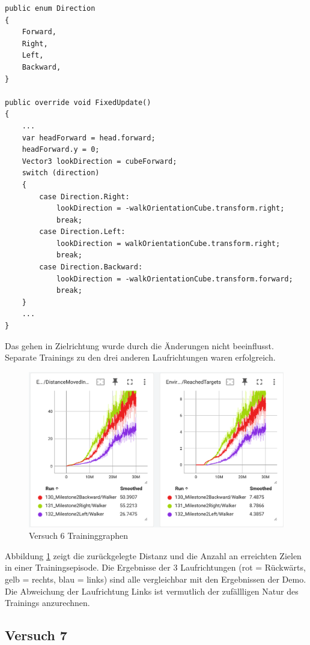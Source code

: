 \begin{lstlisting}[caption={Laufrichtung Enum, Beobachtung und Belohnung},captionpos=b,label={lst:laufrichtung}]
public enum Direction
{
    Forward,
    Right,
    Left,
    Backward,
}
    
public override void FixedUpdate()
{
    ...
    var headForward = head.forward;
    headForward.y = 0;
    Vector3 lookDirection = cubeForward;
    switch (direction)
    {
        case Direction.Right:
            lookDirection = -walkOrientationCube.transform.right;
            break;
        case Direction.Left:
            lookDirection = walkOrientationCube.transform.right;
            break;
        case Direction.Backward:
            lookDirection = -walkOrientationCube.transform.forward;
            break;
    }
    ...
}
\end{lstlisting}

Das gehen in Zielrichtung wurde durch die Änderungen nicht beeinflusst. Separate Trainings zu den drei anderen Laufrichtungen waren erfolgreich.

\begin{figure}[H]
  \centering  
  \includegraphics[scale=0.5]{img/versuch6_training.png}
  \caption{Versuch 6 Traininggraphen}
  \label{fig:versuch6_training}
\end{figure}

Abbildung \ref{fig:versuch6_training} zeigt die zurückgelegte Distanz und die Anzahl an erreichten Zielen in einer Trainingsepisode. Die Ergebnisse der 3 Laufrichtungen (rot = Rückwärts, gelb = rechts, blau = links) sind alle vergleichbar mit den Ergebnissen der Demo. Die Abweichung der Laufrichtung Links ist vermutlich der zufällligen Natur des Trainings anzurechnen.

\subsection{Versuch 7}